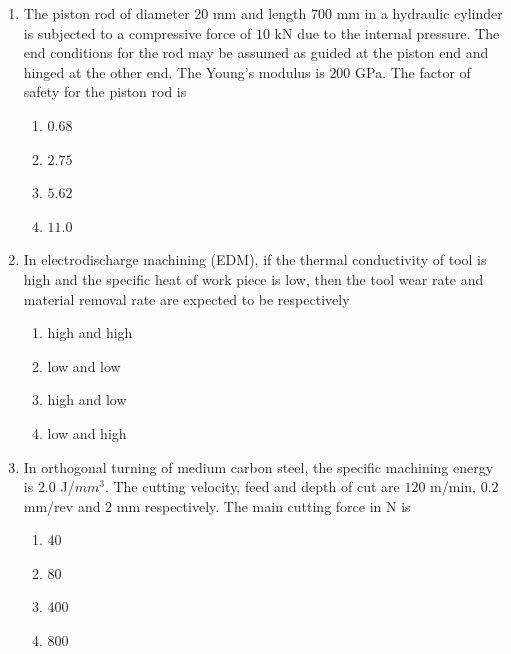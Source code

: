 \documentclass[journal]{IEEEtran}
\begin{document}
\begin{enumerate}[start = 52]
    \item The piston rod of diameter $20$ mm and length $ 700$ mm in a hydraulic cylinder is subjected to a compressive force of $10$ kN due to the internal pressure. The end conditions for the rod may be assumed as guided at the piston end and hinged at the other end. The Young's modulus is $200$ GPa. The factor of safety for the piston rod is
     \begin{multicols}{4}
        \begin{enumerate}
            \item $0.68$
            \item $2.75$
            \item $5.62$
            \item $11.0$
        \end{enumerate}
    \end{multicols}

    \item In electrodischarge machining (EDM), if the thermal conductivity of tool is high and the specific heat of work piece is low, then the tool wear rate and material removal rate are expected to be respectively
     \begin{multicols}{2}
    \begin{enumerate}
        \item high and high
        \item low and low
        \item high and low
        \item low and high
    \end{enumerate}
    \end{multicols}

    \item In orthogonal turning of medium carbon steel, the specific machining energy is $2.0$ J/$mm^{3}$. The cutting velocity, feed and depth of cut are $120$ m/min, $0.2$ mm/rev and $2$ mm respectively. The main cutting force in N is
    \begin{multicols}{4}
        \begin{enumerate}
            \item $40$
            \item $80$
            \item $400$
            \item $800$
        \end{enumerate}
    \end{multicols}


\end{enumerate}
\end{document}
